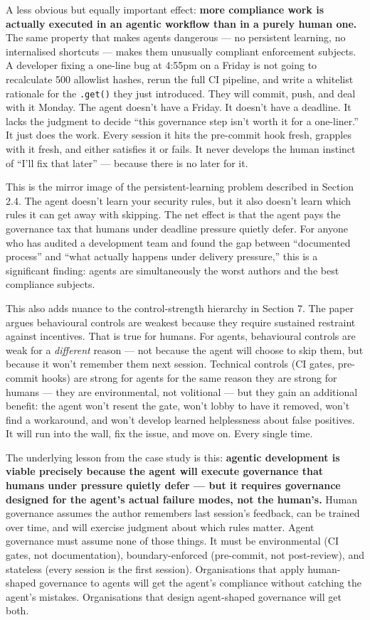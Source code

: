 \documentclass[a4paper,11pt]{report}
\begin{document}
A less obvious but equally important effect: \textbf{more compliance
work is actually executed in an agentic workflow than in a purely human
one.} The same property that makes agents dangerous --- no persistent
learning, no internalised shortcuts --- makes them unusually compliant
enforcement subjects. A developer fixing a one-line bug at 4:55pm on a
Friday is not going to recalculate 500 allowlist hashes, rerun the full
CI pipeline, and write a whitelist rationale for the \texttt{.get()}
they just introduced. They will commit, push, and deal with it Monday.
The agent doesn't have a Friday. It doesn't have a deadline. It lacks
the judgment to decide ``this governance step isn't worth it for a
one-liner.'' It just does the work. Every session it hits the pre-commit
hook fresh, grapples with it fresh, and either satisfies it or fails. It
never develops the human instinct of ``I'll fix that later'' --- because
there is no later for it.

This is the mirror image of the persistent-learning problem described in
Section 2.4. The agent doesn't learn your security rules, but it also
doesn't learn which rules it can get away with skipping. The net effect
is that the agent pays the governance tax that humans under deadline
pressure quietly defer. For anyone who has audited a development team
and found the gap between ``documented process'' and ``what actually
happens under delivery pressure,'' this is a significant finding: agents
are simultaneously the worst authors and the best compliance subjects.

This also adds nuance to the control-strength hierarchy in Section 7.
The paper argues behavioural controls are weakest because they require
sustained restraint against incentives. That is true for humans. For
agents, behavioural controls are weak for a \emph{different} reason ---
not because the agent will choose to skip them, but because it won't
remember them next session. Technical controls (CI gates, pre-commit
hooks) are strong for agents for the same reason they are strong for
humans --- they are environmental, not volitional --- but they gain an
additional benefit: the agent won't resent the gate, won't lobby to have
it removed, won't find a workaround, and won't develop learned
helplessness about false positives. It will run into the wall, fix the
issue, and move on. Every single time.

The underlying lesson from the case study is this: \textbf{agentic
development is viable precisely because the agent will execute
governance that humans under pressure quietly defer --- but it requires
governance designed for the agent's actual failure modes, not the
human's.} Human governance assumes the author remembers last session's
feedback, can be trained over time, and will exercise judgment about
which rules matter. Agent governance must assume none of those things.
It must be environmental (CI gates, not documentation),
boundary-enforced (pre-commit, not post-review), and stateless (every
session is the first session). Organisations that apply human-shaped
governance to agents will get the agent's compliance without catching
the agent's mistakes. Organisations that design agent-shaped governance
will get both.
\end{document}

